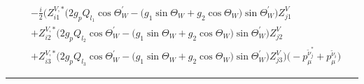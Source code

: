 \begin{align} 
 &-\frac{i}{2} \Big(Z^{V,*}_{i 1} \Big(2 g_p Q_{l_1} \cos\Theta_W^{\prime}   - \Big(g_1 \sin\Theta_W   + g_2 \cos\Theta_W  \Big)\sin\Theta_W^{\prime}  \Big)Z_{{j 1}}^{V} \nonumber \\ 
 &+Z^{V,*}_{i 2} \Big(2 g_p Q_{l_2} \cos\Theta_W^{\prime}   - \Big(g_1 \sin\Theta_W   + g_2 \cos\Theta_W  \Big)\sin\Theta_W^{\prime}  \Big)Z_{{j 2}}^{V} \nonumber \\ 
 &+Z^{V,*}_{i 3} \Big(2 g_p Q_{l_3} \cos\Theta_W^{\prime}   - \Big(g_1 \sin\Theta_W   + g_2 \cos\Theta_W  \Big)\sin\Theta_W^{\prime}  \Big)Z_{{j 3}}^{V} \Big)\Big(- p^{\tilde{\nu}^*_{{j}}}_{\mu}  + p^{\tilde{\nu}_{{i}}}_{\mu}\Big)\end{align} 
\hrule 
